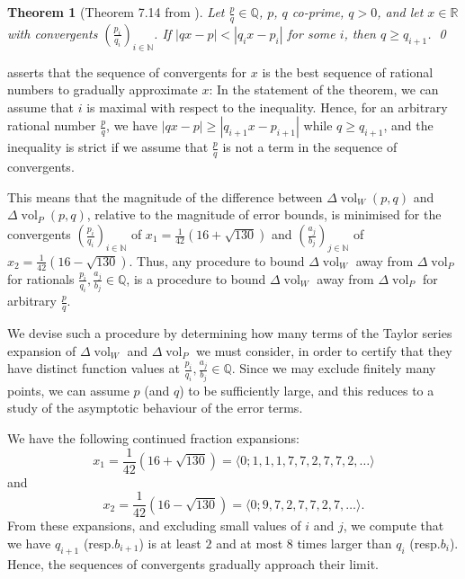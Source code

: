 \documentclass[a4paper]{gtart}
\newtheorem{theorem}[proposition]{Theorem}
\theoremstyle{definition}
\theoremstyle{remark}
\numberwithin{equation}{section}
\DeclareMathOperator{\vol}{vol}
\begin{document}
\begin{theorem}[Theorem 7.14 from \cite{ContinuedFractions}]
  \label{thm:closest}
  Let $\frac{p}{q} \in \mathbb{Q}$, $p$, $q$ co-prime, $q > 0$, and let $x \in \mathbb{R}$
  with convergents $(\frac{p_i}{q_i})_{i \in \mathbb{N}}$. If 
  $|q x - p | < |q_i x - p_i |$ for some $i$, then $q \geq q_{i+1}$. \qed
\end{theorem}

 asserts that the sequence of convergents for $x$ is the 
best sequence of rational numbers to gradually approximate $x$: In the statement of the theorem,
we can assume that $i$ is maximal with respect to the inequality. Hence, for an arbitrary
rational number $\frac{p}{q}$, we have $|q x - p | \geq |q_{i+1} x - p_{i+1} |$ while 
$q \geq q_{i+1}$, and the inequality is strict if we assume that $\frac{p}{q}$ is not a 
term in the sequence of convergents.

This means that the magnitude of the difference between 
$\Delta \vol_W (p,q)$ and $\Delta \vol_P (p,q)$, relative to the magnitude of error bounds, is
minimised for the convergents $(\frac{p_i}{q_i})_{i \in \mathbb{N}}$ of 
$x_1 = \frac{1}{42} \left ( 16 + \sqrt{130}\right)$ and 
$(\frac{a_j}{b_j})_{j \in \mathbb{N}}$ of 
$x_2 = \frac{1}{42} \left ( 16 - \sqrt{130}\right)$.
Thus, any procedure to bound $\Delta \vol_W$ away from $\Delta \vol_P$ for rationals
$\frac{p_i}{q_i}, \frac{a_j}{b_j} \in \mathbb{Q}$, is a procedure to bound $\Delta \vol_W$
away from $\Delta \vol_P$ for arbitrary $\frac{p}{q}$.

We devise such a procedure by determining how many terms of the Taylor series expansion of 
$\Delta \vol_W$ and $\Delta \vol_P$ we must consider, in order to certify that they have 
distinct function values at $\frac{p_i}{q_i}, \frac{a_j}{b_j} \in \mathbb{Q}$. Since we 
may exclude finitely many points, we can assume $p$ (and $q$) to be sufficiently large,
and this reduces to a study of the asymptotic behaviour of the error terms.

We have the following continued fraction expansions:
\[x_1 = \frac{1}{42} \left ( 16 + \sqrt{130}\right) = \langle 0; 1,1,1,7,7,2,7,7,2, \ldots \rangle\]
and
\[x_2 = \frac{1}{42} \left ( 16 - \sqrt{130}\right) = \langle 0; 9,7,2,7,7,2,7, \ldots \rangle.\]
From these expansions, and excluding small values of $i$ and $j$, we compute that we have 
$q_{i+1}$ (resp.\thinspace $b_{i+1}$) is at least $2$ and at most $8$ times larger than 
$q_i$ (resp.\thinspace $b_i$). Hence, the sequences of convergents gradually approach 
their limit.
\end{document}
